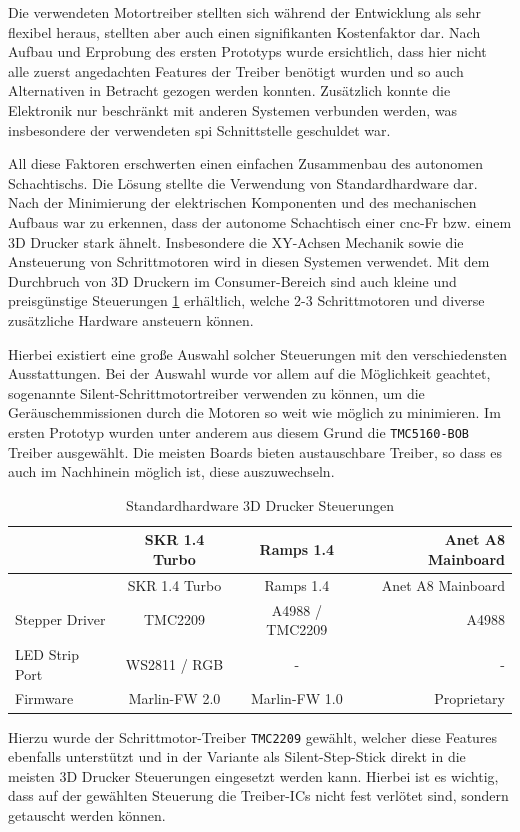 Die verwendeten Motortreiber stellten sich während der Entwicklung als
sehr flexibel heraus, stellten aber auch einen signifikanten
Kostenfaktor dar. Nach Aufbau und Erprobung des ersten Prototyps wurde
ersichtlich, dass hier nicht alle zuerst angedachten Features der
Treiber benötigt wurden und so auch Alternativen in Betracht gezogen
werden konnten. Zusätzlich konnte die Elektronik nur beschränkt mit
anderen Systemen verbunden werden, was insbesondere der verwendeten
\gls{spi} Schnittstelle geschuldet war.

All diese Faktoren erschwerten einen einfachen Zusammenbau des autonomen
Schachtischs. Die Lösung stellte die Verwendung von Standardhardware
dar. Nach der Minimierung der elektrischen Komponenten und des
mechanischen Aufbaus war zu erkennen, dass der autonome Schachtisch
einer \gls{cnc}-Fr bzw. einem 3D Drucker stark ähnelt. Insbesondere die
XY-Achsen Mechanik sowie die Ansteuerung von Schrittmotoren wird in
diesen Systemen verwendet. Mit dem Durchbruch von 3D Druckern im
Consumer-Bereich sind auch kleine und preisgünstige Steuerungen
\ref{3dmarlinctl} erhältlich, welche 2-3 Schrittmotoren und diverse
zusätzliche Hardware ansteuern können.

Hierbei existiert eine große Auswahl solcher Steuerungen mit den
verschiedensten Ausstattungen. Bei der Auswahl wurde vor allem auf die
Möglichkeit geachtet, sogenannte Silent-Schrittmotortreiber verwenden zu
können, um die Geräuschemmissionen durch die Motoren so weit wie möglich
zu minimieren. Im ersten Prototyp wurden unter anderem aus diesem Grund
die \passthrough{\lstinline!TMC5160-BOB!} Treiber ausgewählt. Die
meisten Boards \label{3dmarlinctl} bieten austauschbare Treiber, so dass
es auch im Nachhinein möglich ist, diese auszuwechseln.

\begin{longtable}[]{@{}lccr@{}}
\caption{Standardhardware 3D Drucker Steuerungen
\label{3dmarlinctl}}\tabularnewline
\toprule
& SKR 1.4 Turbo & Ramps 1.4 & Anet A8 Mainboard\tabularnewline
\midrule
\endfirsthead
\toprule
& SKR 1.4 Turbo & Ramps 1.4 & Anet A8 Mainboard\tabularnewline
\midrule
\endhead
Stepper Driver & TMC2209 & A4988 / TMC2209 & A4988\tabularnewline
LED Strip Port & WS2811 / RGB & - & -\tabularnewline
Firmware & Marlin-FW 2.0 & Marlin-FW 1.0 & Proprietary\tabularnewline
\bottomrule
\end{longtable}

Hierzu wurde der Schrittmotor-Treiber \passthrough{\lstinline!TMC2209!}
gewählt, welcher diese Features ebenfalls unterstützt und in der
Variante als Silent-Step-Stick direkt in die meisten 3D Drucker
Steuerungen eingesetzt werden kann. Hierbei ist es wichtig, dass auf der
gewählten Steuerung die Treiber-ICs nicht fest verlötet sind, sondern
getauscht werden können.

